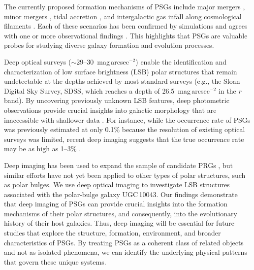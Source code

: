 \documentclass[letter]{aa}
\begin{document}
The currently proposed formation mechanisms of PSGs include major mergers \citep{hibbard95, bekki97, bekki98}, minor mergers \citep{johnston01, 2011MNRAS.414.3645S}, tidal accretion \citep{reshetnikovsotnikova97, bournaudcombes03}, and intergalactic gas infall along cosmological filaments \citep{thakarryden96, thakarryden98, macchio06, brook08}. Each of these scenarios has been confirmed by simulations and agrees with one or more observational findings \citep[see e.g.][]{reshetnikov05, stanonik09, ordenesbriceno16, 2022RAA....22k5003M}. This highlights that PSGs are valuable probes for studying diverse galaxy formation and evolution processes.

Deep optical surveys ($\sim$29--30~mag\,arcsec$^{-2}$) enable the identification and characterization of low surface brightness (LSB) polar structures that remain undetectable at the depths achieved by most standard surveys (e.g., the Sloan Digital Sky Survey, SDSS, which reaches a depth of 26.5~mag\,arcsec$^{-2}$ in the $r$ band). By uncovering previously unknown LSB features, deep photometric observations provide crucial insights into galactic morphology that are inaccessible with shallower data \citep{2015MNRAS.446..120D, 2022MNRAS.514.4898V, 2023A&A...671A.141M}. For instance, while the occurrence rate of PSGs was previously estimated at only 0.1\% because the resolution of existing optical surveys was limited, recent deep imaging suggests that the true occurrence rate may be as high as 1--3\% \citep{2023MNRAS.525.4663D, 2024A&A...681L..15M}. 

Deep imaging has been used to expand the sample of candidate PRGs \citep{2022RAA....22k5003M}, but similar efforts have not yet been applied to other types of polar structures, such as polar bulges. We use deep optical imaging to investigate LSB structures associated with the polar-bulge galaxy UGC\,10043. Our findings demonstrate that deep imaging of PSGs can provide crucial insights into the formation mechanisms of their polar structures, and consequently, into the evolutionary history of their host galaxies. Thus, deep imaging will be essential for future studies that explore the structure, formation, environment, and broader characteristics of PSGs. By treating PSGs as a coherent class of related objects and not as isolated phenomena, we can identify the underlying physical patterns that govern these unique systems.
\end{document}
